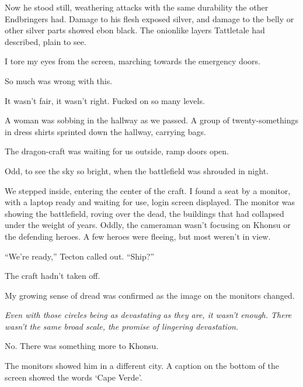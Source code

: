 Now he stood still, weathering attacks with the same durability the other Endbringers had.  Damage to his flesh exposed silver, and damage to the belly or other silver parts showed ebon black.  The onionlike layers Tattletale had described, plain to see.



I tore my eyes from the screen, marching towards the emergency doors.



So much was wrong with this.



It wasn't fair, it wasn't right.  Fucked on so many levels.



A woman was sobbing in the hallway as we passed.  A group of twenty-somethings in dress shirts sprinted down the hallway, carrying bags.



The dragon-craft was waiting for us outside, ramp doors open.



Odd, to see the sky so bright, when the battlefield was shrouded in night.



We stepped inside, entering the center of the craft.  I found a seat by a monitor, with a laptop ready and waiting for use, login screen displayed.  The monitor was showing the battlefield, roving over the dead, the buildings that had collapsed under the weight of years.  Oddly, the cameraman wasn't focusing on Khonsu or the defending heroes.  A few heroes were fleeing, but most weren't in view.



``We're ready,'' Tecton called out.  ``Ship?''



The craft hadn't taken off.



My growing sense of dread was confirmed as the image on the monitors changed.



\emph{Even with those circles being as devastating as they are, it wasn't enough.  There wasn't the same broad scale, the promise of lingering devastation}.



No.  There was something more to Khonsu.



The monitors showed him in a different city.  A caption on the bottom of the screen showed the words `Cape Verde'.



